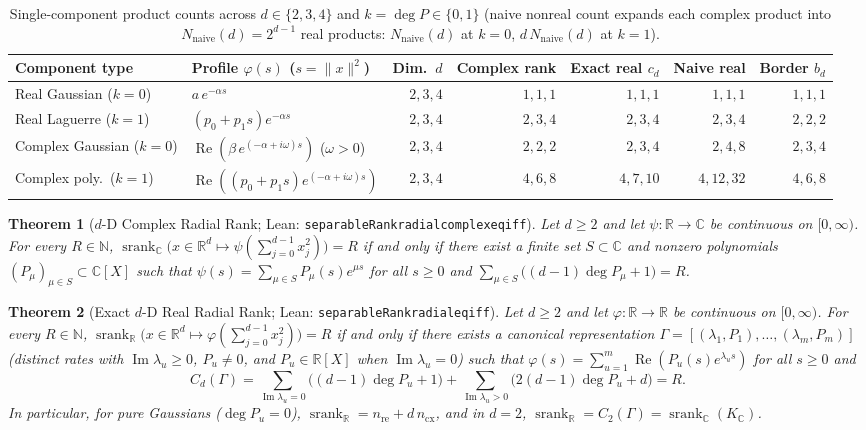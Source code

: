 \documentclass[11pt,a4paper]{article}
\theoremstyle{plain}
\newtheorem{theorem}{Theorem}[section]
\theoremstyle{definition}
\newcommand{\R}{\mathbb{R}}
\newcommand{\C}{\mathbb{C}}
\newcommand{\N}{\mathbb{N}}
\newcommand{\Nnaive}{N_{\mathrm{naive}}}
\DeclareMathOperator{\RePart}{Re}
\DeclareMathOperator{\ImPart}{Im}
\DeclareMathOperator{\srank}{srank}
\DeclareRobustCommand{\leanid}[1]{{\def\_{\textunderscore\allowbreak}\texttt{#1}}}
\begin{document}
\begin{table}[t]
\centering
\caption{Single-component product counts across $d \in \{2, 3, 4\}$ and $k = \deg P \in \{0, 1\}$ (naive nonreal count expands each complex product into $\Nnaive(d) = 2^{d-1}$ real products: $\Nnaive(d)$ at $k{=}0$, $d\,\Nnaive(d)$ at $k{=}1$).}\label{tab:cost_guide}
\smallskip
{\scriptsize\setlength{\tabcolsep}{2.8pt}
\begin{tabular}{@{}llrrrrr@{}}
\toprule
Component type & Profile $\varphi(s)$ ($s = \|x\|^2$) & Dim.\ $d$ & Complex rank & Exact real $c_d$ & Naive real & Border $b_d$ \\
\midrule
Real Gaussian ($k = 0$) & $a\,e^{-\alpha s}$ & $2, 3, 4$ & $1, 1, 1$ & $1, 1, 1$ & $1, 1, 1$ & $1, 1, 1$ \\
Real Laguerre ($k = 1$) & $(p_0 + p_1 s)e^{-\alpha s}$ & $2, 3, 4$ & $2, 3, 4$ & $2, 3, 4$ & $2, 3, 4$ & $2, 2, 2$ \\
\midrule
Complex Gaussian ($k = 0$) & $\RePart(\beta\, e^{(-\alpha + i\omega)s})$ ($\omega > 0$) & $2, 3, 4$ & $2, 2, 2$ & $2, 3, 4$ & $2, 4, 8$ & $2, 3, 4$ \\
Complex poly.\ ($k = 1$) & $\RePart((p_0 + p_1 s)e^{(-\alpha + i\omega)s})$ & $2, 3, 4$ & $4, 6, 8$ & $4, 7, 10$ & $4, 12, 32$ & $4, 6, 8$ \\
\bottomrule
\end{tabular}}
\end{table}

\begin{theorem}[$d$-D Complex Radial Rank; Lean: \leanid{separableRank\_radial\_complex\_eq\_iff}]\label{thm:complex_nd}
Let $d \ge 2$ and let $\psi : \R \to \C$ be continuous on $[0,\infty)$. For every $R \in \N$, $\srank_{\C}\bigl(x \in \R^d \mapsto \psi(\sum_{j=0}^{d-1} x_j^2)\bigr) = R$ if and only if there exist a finite set $S \subset \C$ and nonzero polynomials $(P_\mu)_{\mu \in S} \subset \C[X]$ such that $\psi(s) = \sum_{\mu \in S} P_\mu(s)e^{\mu s}$ for all $s \ge 0$ and $\sum_{\mu \in S} \bigl((d - 1)\deg P_\mu + 1\bigr) = R$.
\end{theorem}

\begin{theorem}[Exact $d$-D Real Radial Rank; Lean: \leanid{separableRank\_radial\_eq\_iff}]\label{thm:real_nd}
Let $d \ge 2$ and let $\varphi : \R \to \R$ be continuous on $[0,\infty)$. For every $R \in \N$, $\srank_{\R}\bigl(x \in \R^d \mapsto \varphi(\sum_{j=0}^{d-1} x_j^2)\bigr) = R$ if and only if there exists a canonical representation $\Gamma = [(\lambda_1, P_1), \dots, (\lambda_m, P_m)]$ (distinct rates with $\ImPart\lambda_u \ge 0$, $P_u \ne 0$, and $P_u \in \R[X]$ when $\ImPart\lambda_u = 0$) such that $\varphi(s) = \sum_{u=1}^m \RePart(P_u(s)e^{\lambda_u s})$ for all $s \ge 0$ and
\[
  C_d(\Gamma) = \sum_{\ImPart\lambda_u = 0} \bigl((d - 1)\deg P_u + 1\bigr) + \sum_{\ImPart\lambda_u > 0} \bigl(2(d - 1)\deg P_u + d\bigr) = R.
\]
In particular, for pure Gaussians ($\deg P_u = 0$), $\srank_{\R} = n_{\mathrm{re}} + d\,n_{\mathrm{cx}}$, and in $d = 2$, $\srank_{\R} = C_2(\Gamma) = \srank_{\C}(K_{\C})$.
\end{theorem}
\end{document}
